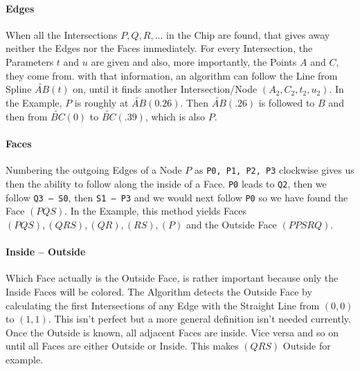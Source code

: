\paragraph{Edges}
	When all the Intersections $P, Q, R, ...$ in the Chip are found, that gives away neither the Edges nor the Faces immediately. For every Intersection, the Parameters $t$ and $u$ are given and also, more importantly, the Points $A$ and $C$, they come from. with that information, an algorithm can follow the Line from Spline $\widetilde{AB}(t)$ on, until it finds another Intersection/Node $(A_2, C_2, t_2, u_2)$.
	In the Example, $P$ is roughly at $\widetilde{AB}(0.26)$. Then $\widetilde{AB}(.26)$ is followed to $B$ and then from $\widetilde{BC}(0)$ to $\widetilde{BC}(.39)$, which is also $P$.
\paragraph{Faces}
	Numbering the outgoing Edges of a Node $P$ as {\tt P0, P1, P2, P3} clockwise gives us then the ability to follow along the inside of a Face. {\tt P0} leads to {\tt Q2}, then we follow {\tt Q3 -- S0}, then {\tt S1 -- P3} and we would next follow {\tt P0} so we have found the Face $(PQS)$.
	In the Example, this method yields Faces $(PQS), (QRS), (QR), (RS), (P)$ and the Outside Face $(PPSRQ)$.
\paragraph{Inside – Outside}
	Which Face actually is the Outside Face, is rather important because only the Inside Faces will be colored. The Algorithm detects the Outside Face by calculating the first Intersections of any Edge with the Straight Line from $(0, 0)$ to $(1, 1)$. This isn't perfect but a more general definition isn't needed currently.
	Once the Outside is known, all adjacent Faces are inside. Vice versa and so on until all Faces are either Outside or Inside. This makes $(QRS)$ Outside for example.
